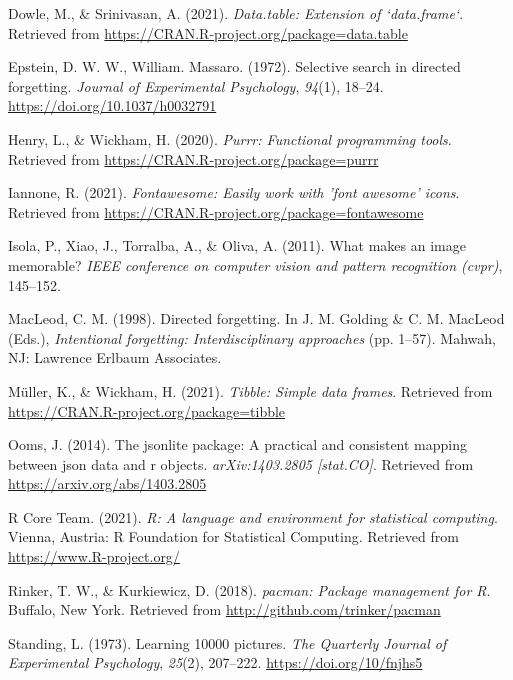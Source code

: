 \documentclass[
  english,
  man,floatsintext]{apa6}
\begin{document}
\leavevmode\hypertarget{ref-R-data.table}{}%
Dowle, M., \& Srinivasan, A. (2021). \emph{Data.table: Extension of `data.frame`}. Retrieved from \url{https://CRAN.R-project.org/package=data.table}

\leavevmode\hypertarget{ref-EpsteinW1972}{}%
Epstein, D. W. W., William. Massaro. (1972). Selective search in directed forgetting. \emph{Journal of Experimental Psychology}, \emph{94}(1), 18--24. \url{https://doi.org/10.1037/h0032791}

\leavevmode\hypertarget{ref-R-purrr}{}%
Henry, L., \& Wickham, H. (2020). \emph{Purrr: Functional programming tools}. Retrieved from \url{https://CRAN.R-project.org/package=purrr}

\leavevmode\hypertarget{ref-R-fontawesome}{}%
Iannone, R. (2021). \emph{Fontawesome: Easily work with 'font awesome' icons}. Retrieved from \url{https://CRAN.R-project.org/package=fontawesome}

\leavevmode\hypertarget{ref-Isola2011}{}%
Isola, P., Xiao, J., Torralba, A., \& Oliva, A. (2011). What makes an image memorable? \emph{IEEE conference on computer vision and pattern recognition (cvpr)}, 145--152.

\leavevmode\hypertarget{ref-macleodDirectedForgetting1998}{}%
MacLeod, C. M. (1998). Directed forgetting. In J. M. Golding \& C. M. MacLeod (Eds.), \emph{Intentional forgetting: Interdisciplinary approaches} (pp. 1--57). Mahwah, NJ: Lawrence Erlbaum Associates.

\leavevmode\hypertarget{ref-R-tibble}{}%
Müller, K., \& Wickham, H. (2021). \emph{Tibble: Simple data frames}. Retrieved from \url{https://CRAN.R-project.org/package=tibble}

\leavevmode\hypertarget{ref-R-jsonlite}{}%
Ooms, J. (2014). The jsonlite package: A practical and consistent mapping between json data and r objects. \emph{arXiv:1403.2805 {[}stat.CO{]}}. Retrieved from \url{https://arxiv.org/abs/1403.2805}

\leavevmode\hypertarget{ref-R-base}{}%
R Core Team. (2021). \emph{R: A language and environment for statistical computing}. Vienna, Austria: R Foundation for Statistical Computing. Retrieved from \url{https://www.R-project.org/}

\leavevmode\hypertarget{ref-R-pacman}{}%
Rinker, T. W., \& Kurkiewicz, D. (2018). \emph{pacman: Package management for R}. Buffalo, New York. Retrieved from \url{http://github.com/trinker/pacman}

\leavevmode\hypertarget{ref-standingLearning10000Pictures1973}{}%
Standing, L. (1973). Learning 10000 pictures. \emph{The Quarterly Journal of Experimental Psychology}, \emph{25}(2), 207--222. \url{https://doi.org/10/fnjhs5}
\end{document}
